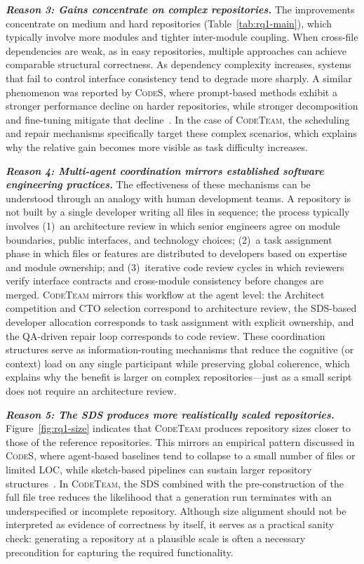 \documentclass[format=acmsmall, review=false, screen=true]{acmart}
\newcommand{\fakesection}[2][1em]{\vspace{#1}\noindent\textit{\textbf{#2}}}
\newcommand{\tool}{\textsc{CodeTeam}\xspace}
\newcommand{\codes}{\textsc{CodeS}\xspace}
\begin{document}
\fakesection{Reason 3: Gains concentrate on complex repositories.}
The improvements concentrate on medium and hard repositories (Table~\ref{tab:rq1-main}), which typically involve more modules and tighter inter-module coupling.
When cross-file dependencies are weak, as in easy repositories, multiple approaches can achieve comparable structural correctness.
As dependency complexity increases, systems that fail to control interface consistency tend to degrade more sharply.
A similar phenomenon was reported by \codes, where prompt-based methods exhibit a stronger performance decline on harder repositories, while stronger decomposition and fine-tuning mitigate that decline~\cite{Zan2025CodeS}.
In the case of \tool, the scheduling and repair mechanisms specifically target these complex scenarios, which explains why the relative gain becomes more visible as task difficulty increases.

\fakesection{Reason 4: Multi-agent coordination mirrors established software engineering practices.}
The effectiveness of these mechanisms can be understood through an analogy with human development teams.
A repository is not built by a single developer writing all files in sequence; the process typically involves (1)~an architecture review in which senior engineers agree on module boundaries, public interfaces, and technology choices; (2)~a task assignment phase in which files or features are distributed to developers based on expertise and module ownership; and (3)~iterative code review cycles in which reviewers verify interface contracts and cross-module consistency before changes are merged.
\tool mirrors this workflow at the agent level: the Architect competition and CTO selection correspond to architecture review, the SDS-based developer allocation corresponds to task assignment with explicit ownership, and the QA-driven repair loop corresponds to code review.
These coordination structures serve as information-routing mechanisms that reduce the cognitive (or context) load on any single participant while preserving global coherence, which explains why the benefit is larger on complex repositories---just as a small script does not require an architecture review.

\fakesection{Reason 5: The SDS produces more realistically scaled repositories.}
Figure~\ref{fig:rq1-size} indicates that \tool produces repository sizes closer to those of the reference repositories.
This mirrors an empirical pattern discussed in \codes, where agent-based baselines tend to collapse to a small number of files or limited LOC, while sketch-based pipelines can sustain larger repository structures~\cite{Zan2025CodeS}.
In \tool, the SDS combined with the pre-construction of the full file tree reduces the likelihood that a generation run terminates with an underspecified or incomplete repository.
Although size alignment should not be interpreted as evidence of correctness by itself, it serves as a practical sanity check: generating a repository at a plausible scale is often a necessary precondition for capturing the required functionality.
\end{document}
